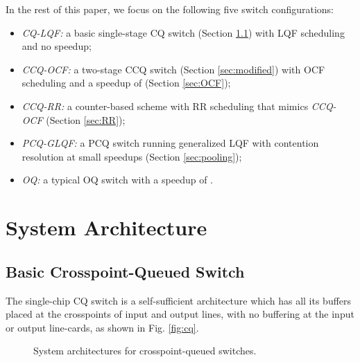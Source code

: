 \documentclass[journal,final,doublecolumn,10pt,twoside]{IEEEtranTCOM} \normalsize
\begin{document}
In the rest of this paper, we focus on the following five switch configurations:
\begin{itemize}
\item \emph{CQ-LQF:} a basic single-stage CQ switch (Section \ref{sec:basic}) with LQF scheduling and no speedup;

\item \emph{CCQ-OCF:} a two-stage CCQ switch (Section \ref{sec:modified}) with OCF scheduling and a speedup of  (Section \ref{sec:OCF});

\item \emph{CCQ-RR:} a counter-based scheme with RR scheduling that mimics \emph{CCQ-OCF} (Section \ref{sec:RR});

\item \emph{PCQ-GLQF:} a PCQ switch running generalized LQF with contention resolution at small speedups (Section \ref{sec:pooling});

\item \emph{OQ:} a typical OQ switch with a speedup of .


\end{itemize}



\section{System Architecture}
\label{sec:system}

\subsection{Basic Crosspoint-Queued Switch}
\label{sec:basic}

The single-chip CQ switch \cite{cqs} is a self-sufficient architecture which has all its buffers placed at the crosspoints of input and output lines, with no buffering at the input or output line-cards, as shown in Fig. \ref{fig:cq}.



\begin{figure}[ht]
\begin{minipage}[t]{3.2 in}
\centering {}
\end{minipage}
\begin{minipage}[t]{3.2 in}
\centering {}
\end{minipage}
\caption{System architectures for crosspoint-queued switches.}
\label{fig:exampleIII}
\end{figure}
\end{document}
